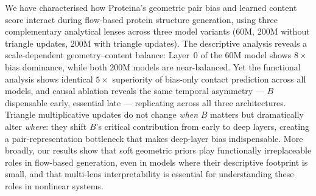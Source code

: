 \documentclass{article}
\begin{document}
We have characterised how Proteina's geometric pair bias and learned content score interact during flow-based protein structure generation, using three complementary analytical lenses across three model variants (60M, 200M without triangle updates, 200M with triangle updates).
The descriptive analysis reveals a scale-dependent geometry--content balance: Layer~0 of the 60M model shows $8\times$ bias dominance, while both 200M models are near-balanced.
Yet the functional analysis shows identical $5\times$ superiority of bias-only contact prediction across all models, and causal ablation reveals the same temporal asymmetry --- $B$ dispensable early, essential late --- replicating across all three architectures.
Triangle multiplicative updates do not change \emph{when} $B$ matters but dramatically alter \emph{where}: they shift $B$'s critical contribution from early to deep layers, creating a pair-representation bottleneck that makes deep-layer bias indispensable.
More broadly, our results show that soft geometric priors play functionally irreplaceable roles in flow-based generation, even in models where their descriptive footprint is small, and that multi-lens interpretability is essential for understanding these roles in nonlinear systems.
\end{document}
